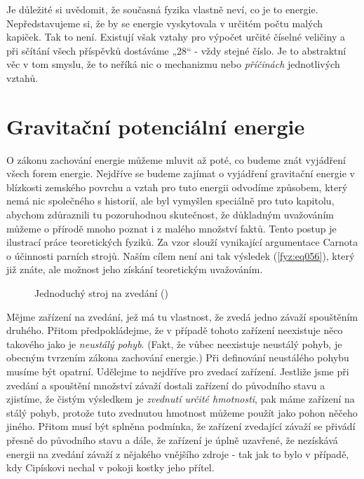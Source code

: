     Je důležité si uvědomit, že současná fyzika vlastně neví, co je to energie. Nepředstavujeme si, 
    že by se energie vyskytovala v určitém počtu malých kapiček. Tak to není. Existují však vztahy 
    pro výpočet určité číselné veličiny a při sčítání všech příspěvků dostáváme „\num{28}“ - vždy 
    stejné číslo. Je to abstraktní věc v tom smyslu, že to neříká nic o mechanizmu nebo 
    \emph{příčinách} jednotlivých vztahů.
    
  \section{Gravitační potenciální energie}
    O zákonu zachování energie můžeme mluvit až poté, co budeme znát vyjádření všech forem energie. 
    Nejdříve se budeme zajímat o vyjádření gravitační energie v blízkosti zemského povrchu a vztah 
    pro tuto energii odvodíme způsobem, který nemá nic společného s historií, ale byl vymyšlen 
    speciálně pro tuto kapitolu, abychom zdůraznili tu pozoruhodnou skutečnost, že důkladným 
    uvažováním můžeme o přírodě mnoho poznat i z malého množství faktů. Tento postup je ilustrací 
    práce teoretických fyziků. Za vzor slouží vynikající argumentace Carnota o účinnosti parních 
    strojů. Naším cílem není ani tak výsledek (\ref{fyz:eq056}), který již znáte, ale možnost jeho 
    získání teoretickým uvažováním.

    \begin{figure}[ht!]  %
      \centering
      \caption{Jednoduchý stroj na zvedání (\cite[s.~52]{Feynman01})}
      \label{fyz:fig048}
    \end{figure}
    Mějme zařízení na zvedání, jež má tu vlastnost, že zvedá jedno závaží spouštěním druhého. 
    Přitom předpokládejme, že v případě tohoto zařízení neexistuje něco takového jako je 
    \emph{neustálý pohyb}. (Fakt, že vůbec neexistuje neustálý pohyb, je obecným tvrzením zákona 
    zachování energie.) Při definování neustálého pohybu musíme být opatrní. Udělejme to nejdříve 
    pro zvedací zařízení. Jestliže jsme při zvedání a spouštění množství závaží dostali zařízení do 
    původního stavu a zjistíme, že čistým výsledkem je \emph{zvednutí určité hmotnosti}, pak máme 
    zařízení na stálý pohyb, protože tuto zvednutou hmotnost můžeme použít jako pohon něčeho 
    jiného. Přitom musí být splněna podmínka, že zařízení zvedající závaží se přivádí přesně do 
    původního stavu a dále, že zařízení je úplně uzavřené, že nezískává energii na zvedání závaží z 
    nějakého vnějšího zdroje - tak jak to bylo v případě, kdy Cipískovi nechal v pokoji kostky jeho 
    přítel.
    
